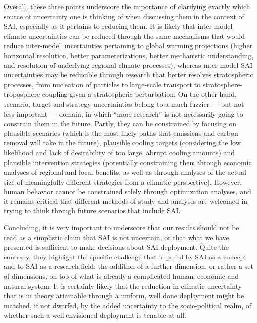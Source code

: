 \documentclass[draft]{agujournal2019}
\begin{document}
Overall, these three points underscore the importance of clarifying exactly which source of uncertainty one is thinking of when discussing them in the context of SAI, especially as it pertains to reducing them. It is likely that inter-model climate uncertainties can be reduced through the same mechanisms that would reduce inter-model uncertainties pertaining to global warming projections (higher horizontal resolution, better parameterizations, better mechanistic understanding, and resolution of underlying regional climate processes), whereas inter-model SAI uncertainties may be reducible through research that better resolves stratospheric processes, from nucleation of particles to large-scale transport to stratosphere-troposphere coupling given a stratospheric perturbation. On the other hand, scenario, target and strategy uncertainties belong to a much fuzzier --- but not less important --- domain, in which ``more research'' is not necessarily going to constrain them in the future. Partly, they can be constrained by focusing on plausible scenarios (which is the most likely paths that emissions and carbon removal will take in the future), plausible cooling targets (considering the low likelihood and lack of desirability of too large, abrupt cooling amounts) and plausible intervention strategies (potentially constraining them through economic analyses of regional and local benefits, as well as through analyses of the actual size of meaningfully different strategies from a climatic perspective). However, human behavior cannot be constrained solely through optimization analyses, and it remains critical that different methods of study and analyses are welcomed in trying to think through future scenarios that include SAI.

Concluding, it is very important to underscore that our results should not be read as a simplistic claim that SAI is not uncertain, or that what we have presented is sufficient to make decisions about SAI deployment. Quite the contrary, they highlight the specific challenge that is posed by SAI as a concept and to SAI as a research field: the addition of a further dimension, or rather a set of dimensions, on top of what is already a complicated human, economic and natural system. It is certainly likely that the reduction in climatic uncertainty that is in theory attainable through a uniform, well done deployment might be matched, if not dwarfed, by the added uncertainty to the socio-political realm, of whether such a well-envisioned deployment is tenable at all.
\end{document}
